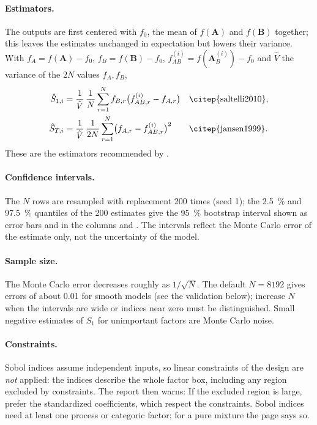 \paragraph{Estimators.} The outputs are first centered with $f_0$, the mean of $f(\mathbf A)$ and $f(\mathbf B)$
together; this leaves the estimates unchanged in expectation but lowers their variance. With
$f_A=f(\mathbf A)-f_0$, $f_B=f(\mathbf B)-f_0$, $f_{AB}^{(i)}=f(\mathbf A_B^{(i)})-f_0$ and $\hat V$ the variance of
the $2N$ values $f_A,f_B$,
\begin{align}
\hat S_{1,i}&=\frac{1}{\hat V}\,\frac1N\sum_{r=1}^N f_{B,r}\bigl(f_{AB,r}^{(i)}-f_{A,r}\bigr)
&&\text{\citep{saltelli2010}},\label{eq:ch09-s1}\\
\hat S_{T,i}&=\frac{1}{\hat V}\,\frac1{2N}\sum_{r=1}^N\bigl(f_{A,r}-f_{AB,r}^{(i)}\bigr)^2
&&\text{\citep{jansen1999}}.\label{eq:ch09-st}
\end{align}
These are the estimators recommended by \citet{saltelli2010}.

\paragraph{Confidence intervals.} The $N$ rows are resampled with replacement 200 times (seed 1); the 2.5~\% and
97.5~\% quantiles of the 200 estimates give the 95~\% bootstrap interval shown as error bars and in the columns
 and . The intervals reflect the Monte Carlo error of the estimate only, not
the uncertainty of the model.

\paragraph{Sample size.} The Monte Carlo error decreases roughly as $1/\sqrt N$. The default $N=8192$ gives errors of
about 0.01 for smooth models (see the validation below); increase $N$ when the intervals are wide or indices near zero
must be distinguished. Small negative estimates of $S_1$ for unimportant factors are Monte Carlo noise.

\paragraph{Constraints.} Sobol indices assume independent inputs, so linear constraints of the design are
\emph{not} applied: the indices describe the whole factor box, including any region excluded by constraints. The report
then warns:  If the excluded region is large, prefer the standardized
coefficients, which respect the constraints. Sobol indices need at least one process or categoric factor; for a pure
mixture the page says so.

